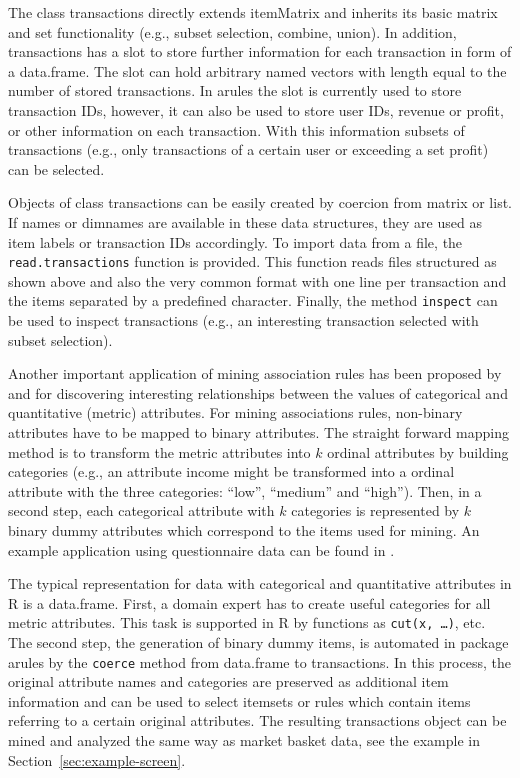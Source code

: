 \documentclass[10pt,a4paper]{article}
\newcommand{\strong}[1]{{\normalfont\fontseries{b}\selectfont #1}}
\newcommand{\class}[1]{\textsf{#1}}
\newcommand{\code}[1]{\texttt{#1}}
\newcommand{\pkg}[1]{\strong{#1}}
\newcommand{\proglang}[1]{\textsf{#1}}
\begin{document}
The class \class{transactions} directly extends \class{itemMatrix} and inherits
its basic matrix and set functionality (e.g., subset selection, combine,
union).  In addition, \class{transactions} has a slot to store further
information for each transaction in form of a \class{data.frame}.  The slot can
hold arbitrary named vectors with length equal to the number of stored
transactions.  In \pkg{arules} the slot is currently used to store transaction
IDs, however, it can also be used to store user IDs, revenue or profit, or
other information on each transaction.  With this information subsets of
transactions (e.g., only transactions of a certain user or exceeding a set
profit) can be selected.

Objects of class \class{transactions} can be easily created by coercion from
\class{matrix} or \class{list}.  If names or dimnames are available in these
data structures, they are used as item labels or transaction IDs accordingly.
To import data from a file, the \code{read.transactions} function is provided.
This function reads files structured as shown above and also the very common
format with one line per transaction and the items separated by a predefined
character.  Finally, the method \code{inspect} can be used to inspect
transactions (e.g., an interesting transaction selected with subset selection).

Another important application of mining association rules has been proposed by
\cite{arules:Piatetsky-Shapiro:1991} and \cite{arules:Srikant+Agrawal:1996} for
discovering interesting relationships between the values of categorical and
quantitative (metric) attributes.  For mining associations rules, non-binary
attributes have to be mapped to binary attributes. The straight forward mapping
method is to transform the metric attributes into $k$ ordinal attributes by
building categories (e.g., an attribute income might be transformed into a
ordinal attribute with the three categories: ``low'', ``medium'' and ``high'').
Then, in a second step, each categorical attribute with $k$ categories is
represented by $k$ binary dummy attributes which correspond to the items used
for mining.  An example application using questionnaire data can be found in
\cite{arules:Hastie+Tibshirani+Friedman:2001}.

The typical representation for data with categorical and quantitative
attributes in \proglang{R} is a \class{data.frame}.  First, a domain expert has
to create useful categories for all metric attributes.  This task is
supported in \proglang{R} by functions as \code{cut(x, \ldots)}, etc.  The
second step, the generation of binary dummy items, is automated in package
\pkg{arules} by the \code{coerce} method from \class{data.frame} to
\class{transactions}.  In this process, the original attribute names and
categories are preserved as additional item information and can be used
to select itemsets or rules which contain items referring to a certain original
attributes.  The resulting \class{transactions} object can be mined and
analyzed the same way as market basket data, see the example in
Section~\ref{sec:example-screen}.
\end{document}
